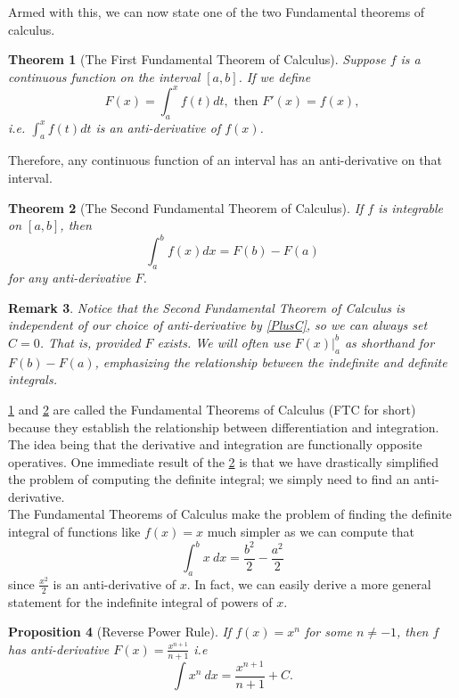 \documentclass[12pt]{article}
\newcommand{\eval}[1]{ \left. #1 \right| }
\newtheorem{thm}{Theorem}[section]
\newtheorem{prop}[thm]{Proposition}
\theoremstyle{definition}
\theoremstyle{plain}
\newtheorem{rem}[thm]{Remark}
\numberwithin{equation}{section}
\begin{document}
Armed with this, we can now state one of the two Fundamental theorems of calculus.

\begin{thm}[The First Fundamental Theorem of Calculus]\label{FundThmOne}
  Suppose $f$ is a continuous function on the interval $[a,b]$. If we define \begin{equation}
    F(x)=\int_{a}^x f(t)dt,\text{ then } F'(x)=f(x),
  \end{equation}
  i.e. $\int_{a}^x f(t)dt$ is an anti-derivative of $f(x)$.
\end{thm}
Therefore, any continuous function of an interval has an anti-derivative on that interval.
\begin{thm}[The Second Fundamental Theorem of Calculus]\label{FundThmTwo} If $f$ is integrable on $[a,b]$, then \begin{equation}\label{FTC2}
  \int_{a}^{b}f(x)dx=F(b)-F(a)
\end{equation}for any anti-derivative $F$.
\end{thm}
\begin{rem}
  Notice that the Second Fundamental Theorem of Calculus is independent of our choice of anti-derivative by \cref{PlusC}, so we can always set $C=0$. That is, provided $F$ exists. We will often use $\eval{F(x)}_{a}^{b}$ as shorthand for $F(b)-F(a)$, emphasizing the relationship between the indefinite and definite integrals.
\end{rem}

\cref{FundThmOne} and \cref{FundThmTwo} are called the Fundamental Theorems of Calculus (FTC for short) because they establish the relationship between differentiation and integration. The idea being that the derivative and integration are functionally opposite operatives. One immediate result of the \cref{FundThmTwo} is that we have drastically simplified the problem of computing the definite integral; we simply need to find an anti-derivative.\\

The Fundamental Theorems of Calculus make the problem of finding the definite integral of functions like $f(x)=x$ much simpler as we can compute that
\begin{equation}
  \int_{a}^{b}x\ dx=\frac{b^2}{2}-\frac{a^2}{2}
\end{equation}
since $\frac{x^2}{2}$ is an anti-derivative of $x$. In fact, we can easily derive a more general statement for the indefinite integral of powers of $x$.

\begin{prop}[Reverse Power Rule]\label{RevPowRule}
  If $f(x)=x^n$ for some $n\neq -1$, then $f$ has anti-derivative $F(x)=\frac{x^{n+1}}{n+1}$ i.e
  \begin{equation}
    \int x^n\ dx=\frac{x^{n+1}}{n+1}+C.
  \end{equation}
\end{prop}
\end{document}
